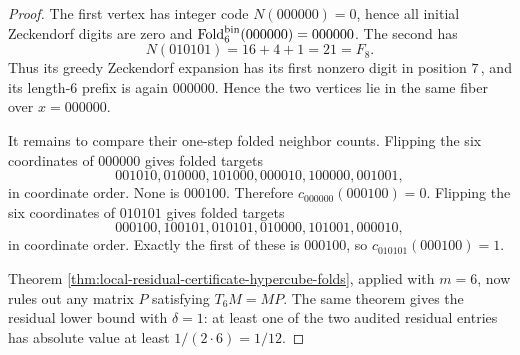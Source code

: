 \begin{proof}
The first vertex has integer code \(N(000000)=0\), hence all initial Zeckendorf digits are zero and \(\operatorname{Fold}_6^{\mathrm{bin}}(000000)=000000\).  The second has
\[
N(010101)=16+4+1=21=F_8.
\]
Thus its greedy Zeckendorf expansion has its first nonzero digit in position \(7\,\), and its length-\(6\) prefix is again \(000000\).  Hence the two vertices lie in the same fiber over \(x=000000\).

It remains to compare their one-step folded neighbor counts.  Flipping the six coordinates of \(000000\) gives folded targets
\[
001010,
010000,
101000,
000010,
100000,
001001,
\]
in coordinate order.  None is \(000100\).  Therefore \(c_{000000}(000100)=0\).  Flipping the six coordinates of \(010101\) gives folded targets
\[
000100,
100101,
010101,
010000,
101001,
000010,
\]
in coordinate order.  Exactly the first of these is \(000100\), so \(c_{010101}(000100)=1\).

Theorem \ref{thm:local-residual-certificate-hypercube-folds}, applied with \(m=6\), now rules out any matrix \(P\) satisfying \(T_6M=MP\).  The same theorem gives the residual lower bound with \(\delta=1\): at least one of the two audited residual entries has absolute value at least \(1/(2\cdot6)=1/12\). \qedhere
\end{proof}

